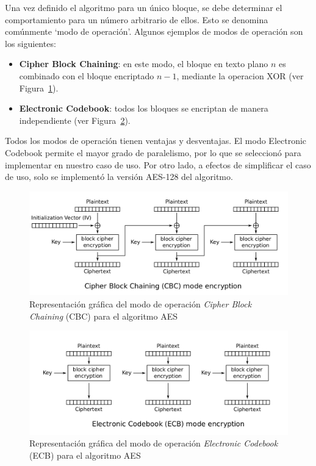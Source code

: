 \documentclass[11pt]{article}
\newcommand{\english}[1]{\textit{#1}}
\begin{document}
Una vez definido el algoritmo para un único bloque, se debe determinar el comportamiento para un número arbitrario de ellos. Esto se denomina comúnmente `modo de operación'. Algunos ejemplos de modos de operación son los siguientes:

\begin{itemize}
    \item \textbf{Cipher Block Chaining}: en este modo, el bloque en texto plano $n$ es combinado con el bloque encriptado $n - 1$, mediante la operacion XOR (ver Figura~\ref{fig:aes_cbc}).
    \item \textbf{Electronic Codebook}: todos los bloques se encriptan de manera independiente (ver Figura~\ref{fig:aes_ecb}).
\end{itemize}

Todos los modos de operación tienen ventajas y desventajas. El modo Electronic Codebook permite el mayor grado de paralelismo, por lo que se seleccionó para implementar en nuestro caso de uso. Por otro lado, a efectos de simplificar el caso de uso, solo se implementó la versión AES-128 del algoritmo.

\begin{figure}[h]
    \centering
    \includegraphics[scale=0.2]{resources/aes/cbc.png}
    \caption{Representación gráfica del modo de operación \english{Cipher Block Chaining} (CBC) para el algoritmo AES}
    \label{fig:aes_cbc}
\end{figure}

\begin{figure}[h]
    \centering
    \includegraphics[scale=0.2]{resources/aes/ecb.png}
    \caption{Representación gráfica del modo de operación \english{Electronic Codebook} (ECB) para el algoritmo AES}
    \label{fig:aes_ecb}
\end{figure}
\end{document}
